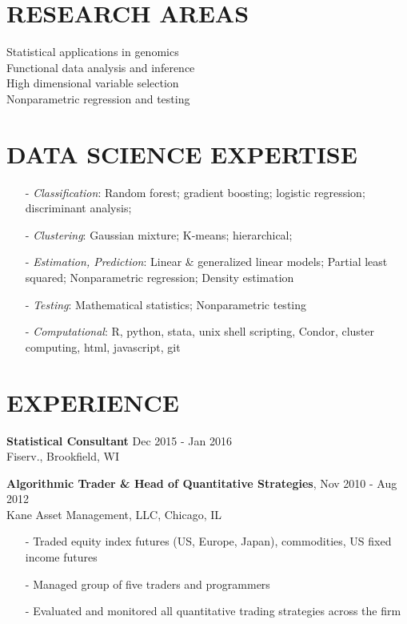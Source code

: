 \documentclass[11pt]{res} %
\begin{document}
\begin{resume}
\section{RESEARCH AREAS} 
Statistical applications in genomics \\
Functional data analysis and inference \\
High dimensional variable selection \\
Nonparametric regression and testing

\section{DATA SCIENCE EXPERTISE} 
\begin{itemize}
\item[-] {\emph{Classification}}: Random forest; gradient boosting; logistic regression; discriminant analysis;
\item[-] {\emph{Clustering}}: Gaussian mixture; K-means; hierarchical; 
\item[-] {\emph{Estimation, Prediction}}: Linear \& generalized linear models; Partial least squared; Nonparametric regression; Density estimation
\item[-] {\emph{Testing}}: Mathematical statistics; Nonparametric testing
\item[-] {\emph{Computational}}: R, python, stata, unix shell scripting, Condor, cluster computing, html, javascript, git
\end{itemize}

\section{EXPERIENCE} 
{\bf{Statistical Consultant}} \hfill Dec 2015 - Jan 2016 \\
Fiserv., Brookfield, WI

{\bf{Algorithmic Trader \& Head of Quantitative Strategies}}, \hfill Nov 2010 - Aug 2012 \\
Kane Asset Management, LLC, Chicago, IL
   \begin{itemize} \itemsep -2pt %
   \item[-] Traded equity index futures (US, Europe, Japan), commodities, US fixed income futures
   \item[-] Managed group of five traders and programmers
   \item[-] Evaluated and monitored all quantitative trading strategies across the firm
   \end{itemize}


\end{resume}
\end{document}
